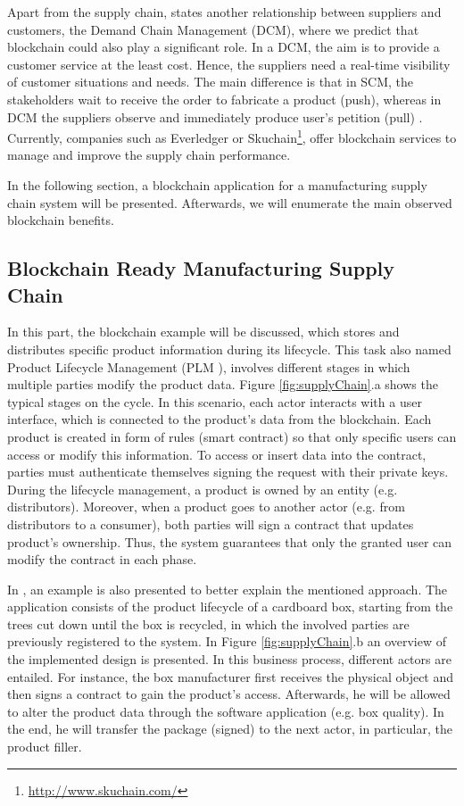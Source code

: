 Apart from the supply chain, \citep{heikkila2002supply} states another relationship between suppliers and customers, the Demand Chain Management (DCM), where we predict that blockchain could also play a significant role. In a DCM, the aim is to provide a customer service at the least cost. Hence, the suppliers need a real-time visibility of customer situations and needs. The main difference is that in SCM, the stakeholders wait to receive the order to fabricate a product (push), whereas in DCM the suppliers observe and immediately produce user's petition (pull) \citep{wust2017you}. Currently, companies such as Everledger or Skuchain\footnote{\url{http://www.skuchain.com/}}, offer blockchain services to manage and improve the supply chain performance.
 
In the following section, a blockchain application for a manufacturing supply chain system will be presented. Afterwards, we will enumerate the main observed blockchain benefits.

\subsection{Blockchain Ready Manufacturing Supply Chain}

In this part, the blockchain example \citep{abeyratne2016blockchain} will be discussed, which stores and distributes specific product information during its lifecycle. This task also named Product Lifecycle Management (PLM \citep{stark2015product}), involves different stages in which multiple parties modify the product data. Figure \ref{fig:supplyChain}.a shows the typical stages on the cycle. In this scenario, each actor interacts with a user interface, which is connected to the product's data from the blockchain. Each product is created in form of rules (smart contract) so that only specific users can access or modify this information. To access or insert data into the contract, parties must authenticate themselves signing the request with their private keys. During the lifecycle management, a product is owned by an entity (e.g. distributors). Moreover, when a product goes to another actor (e.g. from distributors to a consumer), both parties will sign a contract that updates product's ownership. Thus, the system guarantees that only the granted user can modify the contract in each phase.

In \citep{abeyratne2016blockchain}, an example is also presented to better explain the mentioned approach. The application consists of the product lifecycle of a cardboard box, starting from the trees cut down until the box is recycled, in which the involved parties are previously registered to the system. In Figure \ref{fig:supplyChain}.b an overview of the implemented design is presented. In this business process, different actors are entailed. For instance, the box manufacturer first receives the physical object and then signs a contract to gain the product's access. Afterwards, he will be allowed to alter the product data through the software application (e.g. box quality). In the end, he will transfer the package (signed) to the next actor, in particular, the product filler.

